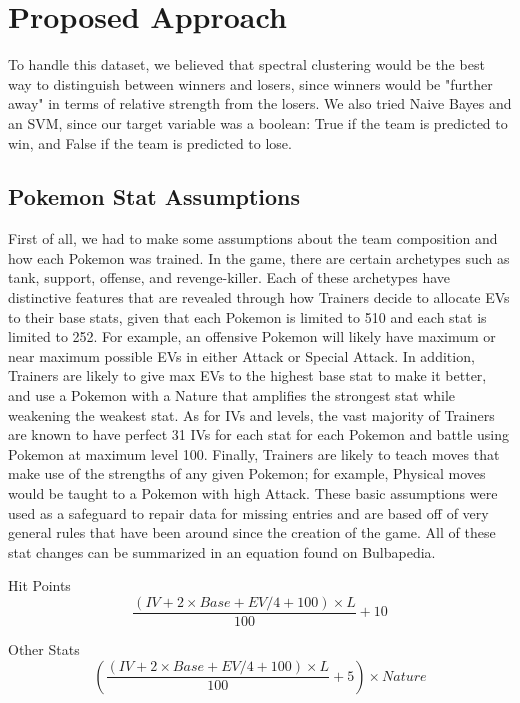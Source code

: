 \documentclass{acm_proc_article-sp}
\begin{document}
\section{Proposed Approach}
To handle this dataset, we believed that spectral clustering would be the best way to distinguish between winners and losers, since winners would be "further away" in terms of relative strength from the losers. We also tried Naive Bayes and an SVM, since our target variable was a boolean: True if the team is predicted to win, and False if the team is predicted to lose.

\subsection{Pokemon Stat Assumptions}
First of all, we had to make some assumptions about the team composition and how each Pokemon was trained. In the game, there are certain archetypes such as tank, support, offense, and revenge-killer. Each of these archetypes have distinctive features that are revealed through how Trainers decide to allocate EVs to their base stats, given that each Pokemon is limited to 510 and each stat is limited to 252. For example, an offensive Pokemon will likely have maximum or near maximum possible EVs in either Attack or Special Attack. In addition, Trainers are likely to give max EVs to the highest base stat to make it better, and use a Pokemon with a Nature that amplifies the strongest stat while weakening the weakest stat. As for IVs and levels, the vast majority of Trainers are known to have perfect 31 IVs for each stat for each Pokemon and battle using Pokemon at maximum level 100. Finally, Trainers are likely to teach moves that make use of the strengths of any given Pokemon; for example, Physical moves would be taught to a Pokemon with high Attack. These basic assumptions were used as a safeguard to repair data for missing entries and are based off of very general rules that have been around since the creation of the game. All of these stat changes can be summarized in an equation found on Bulbapedia.

Hit Points
\begin{equation}\frac{(IV + 2 \times Base + EV/4 + 100) \times L}{100} + 10
\end{equation}

Other Stats
\begin{equation}(\frac{(IV + 2 \times Base + EV/4 + 100) \times L}{100} + 5) \times Nature
\end{equation}
\end{document}
